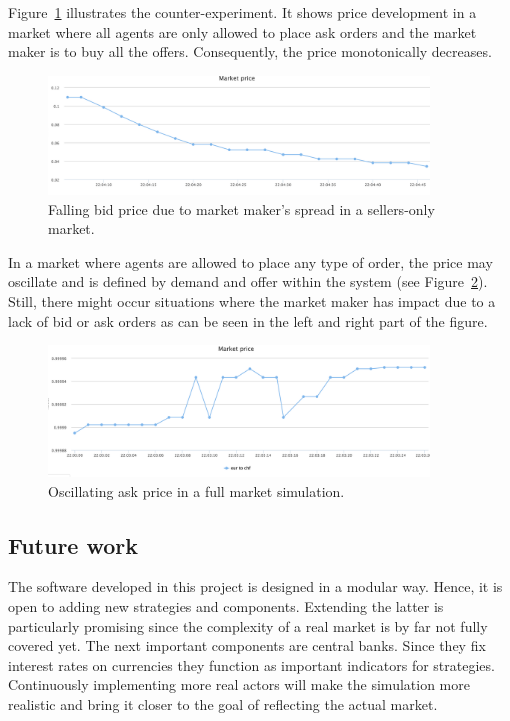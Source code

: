 Figure~\ref{fig:mm-buys} illustrates the counter-experiment. It shows price development
in a market where all agents are only allowed to place ask orders and the market maker
is to buy all the offers. Consequently, the price monotonically decreases.

\begin{figure}[h]
  \center
  \includegraphics[width=0.9\textwidth]{img/examples/simulation-mad-sells-mm-buys.png}
  \caption{Falling bid price due to market maker's spread in a sellers-only market.}
  \label{fig:mm-buys}
\end{figure}

In a market where agents are allowed to place any type of order, the price may oscillate
and is defined by demand and offer within the system (see Figure~\ref{fig:both}).
Still, there might occur situations where the market maker has impact due to a lack of
bid or ask orders as can be seen in the left and right part of the figure.

\begin{figure}[h]
  \center
  \includegraphics[width=0.9\textwidth]{img/examples/simulation-sell-and-buy.png}
  \caption{Oscillating ask price in a full market simulation.}
  \label{fig:both}
\end{figure}

\subsection{Future work}
The software developed in this project is designed in a modular way. Hence, it is open
to adding new strategies and components. Extending the latter is particularly
promising since the complexity of a real market is by far not fully covered yet. The next
important components are central banks. Since they fix interest rates on currencies
they function as important indicators for strategies. Continuously implementing more
real actors will make the simulation more realistic and bring it closer to the goal
of reflecting the actual market.


